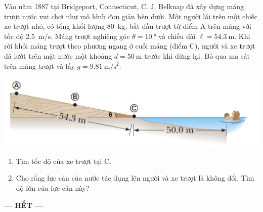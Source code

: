 \begin{ex}
Vào năm 1887 tại Bridgeport, Connecticut, C. J. Belknap đã xây dựng máng trượt nước vui chơi như mô hình đơn giản bên dưới. Một người lái trên một chiếc xe trượt nhỏ, có tổng khối lượng \SI{80}{\kilogram}, bắt đầu trượt từ điểm A trên máng với tốc độ \SI{2.5}{\meter/\second}. Máng trượt nghiêng góc $\theta=\SI{10}{\degree}$ và chiều dài $\ell=\SI{54.3}{\meter}$. Khi rời khỏi máng trượt theo phương ngang ở cuối máng (điểm C), người và xe trượt đã lướt trên mặt nước một khoảng $d=\SI{50}{\meter}$ trước khi dừng lại. Bỏ qua ma sát trên máng trượt và lấy $g=\SI{9.81}{\meter/\second^2}$.
\begin{center}
	\includegraphics[scale=0.4]{../figs/D10-CK2-002-5}
\end{center}
\begin{enumerate}[label=\alph*)]
	\item Tìm tốc độ của xe trượt tại C.
	\item Cho rằng lực cản của nước tác dụng lên người và xe trượt là không đổi. Tìm độ lớn của lực cản này?
\end{enumerate}
	\loigiai{
		
	}
\end{ex}
\begin{center}
	\textbf{--- HẾT ---}
\end{center}